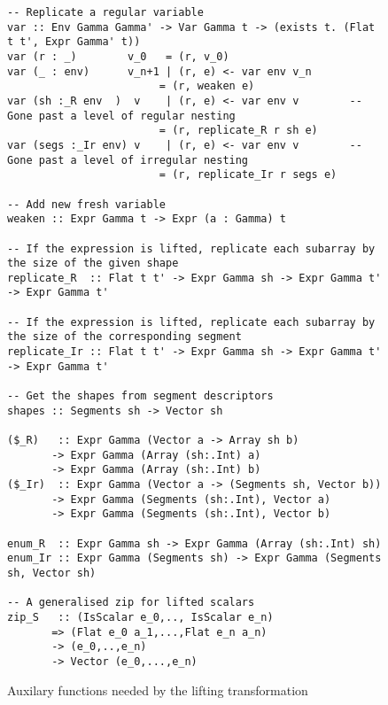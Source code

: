 \begin{figure}
\begin{lstlisting}[style=ndp]
-- Replicate a regular variable
var :: Env Gamma Gamma' -> Var Gamma t -> (exists t. (Flat t t', Expr Gamma' t))
var (r : _)        v_0   = (r, v_0)
var (_ : env)      v_n+1 | (r, e) <- var env v_n
                        = (r, weaken e)
var (sh :_R env  )  v    | (r, e) <- var env v        -- Gone past a level of regular nesting
                        = (r, replicate_R r sh e)
var (segs :_Ir env) v    | (r, e) <- var env v        -- Gone past a level of irregular nesting
                        = (r, replicate_Ir r segs e)

-- Add new fresh variable
weaken :: Expr Gamma t -> Expr (a : Gamma) t

-- If the expression is lifted, replicate each subarray by the size of the given shape
replicate_R  :: Flat t t' -> Expr Gamma sh -> Expr Gamma t' -> Expr Gamma t'

-- If the expression is lifted, replicate each subarray by the size of the corresponding segment
replicate_Ir :: Flat t t' -> Expr Gamma sh -> Expr Gamma t' -> Expr Gamma t'

-- Get the shapes from segment descriptors
shapes :: Segments sh -> Vector sh

($_R)   :: Expr Gamma (Vector a -> Array sh b)
       -> Expr Gamma (Array (sh:.Int) a)
       -> Expr Gamma (Array (sh:.Int) b)
($_Ir)  :: Expr Gamma (Vector a -> (Segments sh, Vector b))
       -> Expr Gamma (Segments (sh:.Int), Vector a)
       -> Expr Gamma (Segments (sh:.Int), Vector b)

enum_R  :: Expr Gamma sh -> Expr Gamma (Array (sh:.Int) sh)
enum_Ir :: Expr Gamma (Segments sh) -> Expr Gamma (Segments sh, Vector sh)

-- A generalised zip for lifted scalars
zip_S   :: (IsScalar e_0,.., IsScalar e_n)
       => (Flat e_0 a_1,...,Flat e_n a_n)
       -> (e_0,..,e_n)
       -> Vector (e_0,...,e_n)
\end{lstlisting}
\caption{Auxilary functions needed by the lifting transformation}
\label{fig:lst-auxillary}
\end{figure}
%
